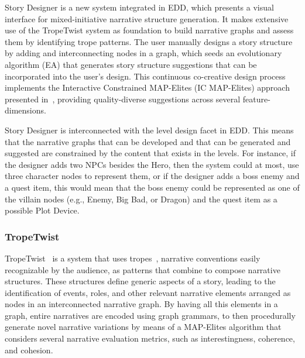  
% 

Story Designer is a new system integrated in EDD, which presents a visual interface for mixed-initiative narrative structure generation. It makes extensive use of the TropeTwist system as foundation to build narrative graphs and assess them by identifying trope patterns. The user manually designs a story structure by adding and interconnecting nodes in a graph, which seeds an evolutionary algorithm (EA) that generates story structure suggestions that can be incorporated into the user's design. This continuous co-creative design process implements the Interactive Constrained MAP-Elites (IC MAP-Elites) approach presented in~\cite{p11alvarez_empowering_2019}, providing quality-diverse suggestions across several feature-dimensions.

Story Designer is interconnected with the level design facet in EDD. This means that the narrative graphs that can be developed and that can be generated and suggested are constrained by the content that exists in the levels. For instance, if the designer adds two NPCs besides the Hero, then the system could at most, use three character nodes to represent them, or if the designer adds a boss enemy and a quest item, this would mean that the boss enemy could be represented as one of the villain nodes (e.g., Enemy, Big Bad, or Dragon) and the quest item as a possible Plot Device.

\subsubsection{TropeTwist}

TropeTwist~\cite{p11alvarez_tropetwist_2022} is a system that uses tropes~\cite{p11lewis_governing_2018,garcia-sanchez_simpsons_2021,richmond_tv_2004,harris_periodic_2016}, narrative conventions easily recognizable by the audience, as patterns that combine to compose narrative structures. These structures define generic aspects of a story, leading to the identification of events, roles, and other relevant narrative elements arranged as nodes in an interconnected narrative graph. By having all this elements in a graph, entire narratives are encoded using graph grammars, to then procedurally generate novel narrative variations by means of a MAP-Elites algorithm that considers several narrative evaluation metrics, such as interestingness, coherence, and cohesion. 

